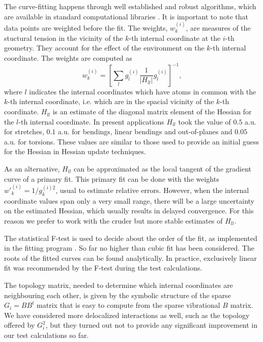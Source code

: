\documentclass[prl,aps,twocolumn,showpacs,twocolumngrid,superbib]{revtex4}
\begin{document}
The curve-fitting happens through 
well established and robust algorithms, which are available in standard 
computational libraries \cite{slatec}. 
It is important to note
that data points are weighted before the fit. The weights, 
$w_{k}^{(i)}$, are
measures of the stuctural tension in the vicinity of the $k$-th internal
coordinate at the $i$-th geometry. They account for the effect of the 
environment on the $k$-th internal coordinate. 
The weights are computed as
\begin{equation}
w_{k}^{(i)} = \left[ \sum_{l} g_{l}^{(i)} \frac{1}{|H_{ll}^{}|} g_{l}^{(i)} \right]^{-1} ,
\end{equation}
where $l$ indicates the internal coordinates which have atoms in common
with the $k$-th internal coordinate, i.e. which are in the spacial 
vicinity of the $k$-th coordinate. 
$H_{ll}^{}$ is an estimate
of the diagonal matrix element of the Hessian for the $l$-th 
internal coordinate. In present applications $H_{ll}$ took
the value of $0.5$ a.u. for stretches, $0.1$ a.u. 
for bendings, linear bendings 
and out-of-planes and $0.05$ a.u. for torsions. These values are
similar to those used to provide an initial guess for the Hessian in
Hessian update techniques.

As an alternative, $H_{ll}$ can be approximated
as the local tangent of the gradient curve of a primary fit. 
This primary fit can be done with 
the weights $w{'}_{k}^{(i)} = 1/g_{k}^{(i)2}$, usual to 
estimate relative errors. However, when the internal coordinate values
span only a very small range, there will be a large uncertainty on the
estimated Hessian, which usually results in delayed convergence. 
For this reason we prefer to work with the cruder but more stable
estimates of $H_{ll}$. 

The statistical F-test is used to decide about the order of the fit,
as implemented in the fitting program \cite{slatec}.
So far no higher than cubic fit has been considered. The roots
of the fitted curves can be found analytically. In practice,
exclusively linear fit was recommended by the F-test during
the test calculations.

The topology matrix, needed to determine which internal coordinates
are neighbouring each other, is given by the symbolic structure of 
the sparse $G_{i}=BB^{t}$ matrix that is easy to compute from the
sparse vibrational $B$ matrix. We have considered more delocalized 
interactions as well, such as the topology offered by $G_i^2$,
but they turned out not to provide any significant improvement in our
test calculations so far.
\end{document}
